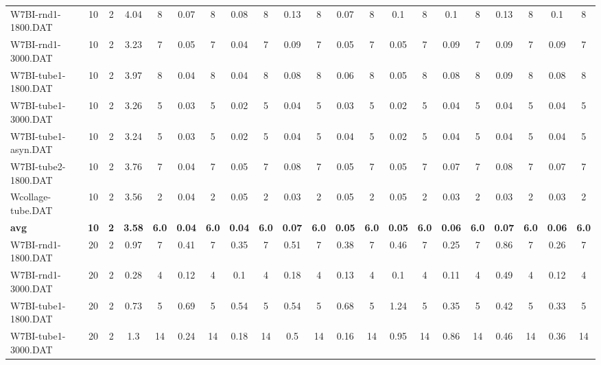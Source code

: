 \begin{sidewaystable}[!ht]
{\begin{tabular}{lcccccccccccccccccccc}
W7BI-rnd1-1800.DAT & 10 & 2 & 4.04 & 8 &  \textcolor{blue2}{0.07} & 8 & 0.08 & 8 & 0.13 & 8 &  \textcolor{blue2}{0.07} & 8 & 0.1 & 8 & 0.1 & 8 & 0.13 & 8 & 0.1 & 8 \\
W7BI-rnd1-3000.DAT & 10 & 2 & 3.23 & 7 & 0.05 & 7 &  \textcolor{blue2}{0.04} & 7 & 0.09 & 7 & 0.05 & 7 & 0.05 & 7 & 0.09 & 7 & 0.09 & 7 & 0.09 & 7 \\
W7BI-tube1-1800.DAT & 10 & 2 & 3.97 & 8 &  \textcolor{blue2}{0.04} & 8 &  \textcolor{blue2}{0.04} & 8 & 0.08 & 8 & 0.06 & 8 & 0.05 & 8 & 0.08 & 8 & 0.09 & 8 & 0.08 & 8 \\
W7BI-tube1-3000.DAT & 10 & 2 & 3.26 & 5 & 0.03 & 5 &  \textcolor{blue2}{0.02} & 5 & 0.04 & 5 & 0.03 & 5 &  \textcolor{blue2}{0.02} & 5 & 0.04 & 5 & 0.04 & 5 & 0.04 & 5 \\
W7BI-tube1-asyn.DAT & 10 & 2 & 3.24 & 5 & 0.03 & 5 &  \textcolor{blue2}{0.02} & 5 & 0.04 & 5 & 0.04 & 5 &  \textcolor{blue2}{0.02} & 5 & 0.04 & 5 & 0.04 & 5 & 0.04 & 5 \\
W7BI-tube2-1800.DAT & 10 & 2 & 3.76 & 7 &  \textcolor{blue2}{0.04} & 7 & 0.05 & 7 & 0.08 & 7 & 0.05 & 7 & 0.05 & 7 & 0.07 & 7 & 0.08 & 7 & 0.07 & 7 \\
Wcollage-tube.DAT & 10 & 2 & 3.56 & 2 & 0.04 & 2 & 0.05 & 2 &  \textcolor{blue2}{0.03} & 2 & 0.05 & 2 & 0.05 & 2 &  \textcolor{blue2}{0.03} & 2 &  \textcolor{blue2}{0.03} & 2 &  \textcolor{blue2}{0.03} & 2 \\
\cline{1-21} \textbf{avg} & \textbf{10} & \textbf{2} & \textbf{3.58} & \textbf{6.0} & \textbf{0.04} & \textbf{6.0} & \textbf{0.04} & \textbf{6.0} & \textbf{0.07} & \textbf{6.0} & \textbf{0.05} & \textbf{6.0} & \textbf{0.05} & \textbf{6.0} & \textbf{0.06} & \textbf{6.0} & \textbf{0.07} & \textbf{6.0} & \textbf{0.06} & \textbf{6.0} \\ \cline{1-21}
W7BI-rnd1-1800.DAT & 20 & 2 & 0.97 & 7 & 0.41 & 7 & 0.35 & 7 & 0.51 & 7 & 0.38 & 7 & 0.46 & 7 &  \textcolor{blue2}{0.25} & 7 & 0.86 & 7 & 0.26 & 7 \\
W7BI-rnd1-3000.DAT & 20 & 2 & 0.28 & 4 & 0.12 & 4 &  \textcolor{blue2}{0.1} & 4 & 0.18 & 4 & 0.13 & 4 &  \textcolor{blue2}{0.1} & 4 & 0.11 & 4 & 0.49 & 4 & 0.12 & 4 \\
W7BI-tube1-1800.DAT & 20 & 2 & 0.73 & 5 & 0.69 & 5 & 0.54 & 5 & 0.54 & 5 & 0.68 & 5 & 1.24 & 5 & 0.35 & 5 & 0.42 & 5 &  \textcolor{blue2}{0.33} & 5 \\
W7BI-tube1-3000.DAT & 20 & 2 & 1.3 & 14 & 0.24 & 14 & 0.18 & 14 & 0.5 & 14 &  \textcolor{blue2}{0.16} & 14 & 0.95 & 14 & 0.86 & 14 & 0.46 & 14 & 0.36 & 14 \\

\end{tabular}}
\end{sidewaystable}
